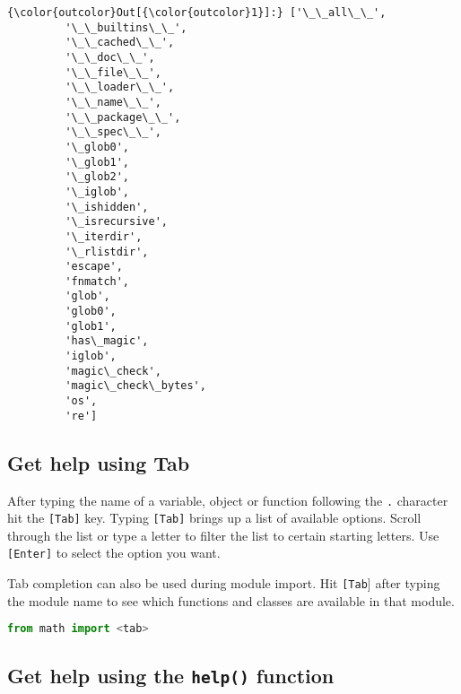 \documentclass{book}
\newcommand{\passthrough}[1]{#1}
\begin{document}
\begin{Verbatim}[commandchars=\\\{\}]
{\color{outcolor}Out[{\color{outcolor}1}]:} ['\_\_all\_\_',
         '\_\_builtins\_\_',
         '\_\_cached\_\_',
         '\_\_doc\_\_',
         '\_\_file\_\_',
         '\_\_loader\_\_',
         '\_\_name\_\_',
         '\_\_package\_\_',
         '\_\_spec\_\_',
         '\_glob0',
         '\_glob1',
         '\_glob2',
         '\_iglob',
         '\_ishidden',
         '\_isrecursive',
         '\_iterdir',
         '\_rlistdir',
         'escape',
         'fnmatch',
         'glob',
         'glob0',
         'glob1',
         'has\_magic',
         'iglob',
         'magic\_check',
         'magic\_check\_bytes',
         'os',
         're']
\end{Verbatim}
            

    
        \hypertarget{get-help-using-tab}{%
\subsection{Get help using Tab}\label{get-help-using-tab}}

After typing the name of a variable, object or function following the
\passthrough{\lstinline!.!} character hit the
\passthrough{\lstinline![Tab]!} key. Typing
\passthrough{\lstinline![Tab]!} brings up a list of available options.
Scroll through the list or type a letter to filter the list to certain
starting letters. Use \passthrough{\lstinline![Enter]!} to select the
option you want.

Tab completion can also be used during module import. Hit
\passthrough{\lstinline![Tab!}{]} after typing the module name to see
which functions and classes are available in that module.
    




    
        \begin{lstlisting}[language=Python]
from math import <tab>
\end{lstlisting}
    




    
        \hypertarget{get-help-using-the-help-function}{%
\subsection{\texorpdfstring{Get help using the \texttt{help()}
function}{Get help using the help() function}}\label{get-help-using-the-help-function}}
\end{document}
